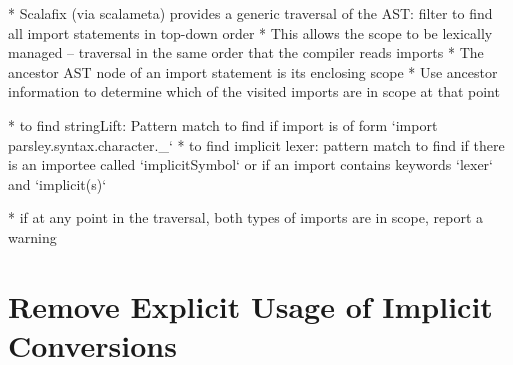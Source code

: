 \documentclass[../../main.tex]{subfiles}
\begin{document}
* Scalafix (via scalameta) provides a generic traversal of the AST: filter to find all import statements in top-down order
* This allows the scope to be lexically managed -- traversal in the same order that the compiler reads imports
* The ancestor AST node of an import statement is its enclosing scope
* Use ancestor information to determine which of the visited imports are in scope at that point

* to find stringLift: Pattern match to find if import is of form `import parsley.syntax.character.\_`
* to find implicit lexer: pattern match to find if there is an importee called `implicitSymbol` or if an import contains keywords `lexer` and `implicit(s)`

* if at any point in the traversal, both types of imports are in scope, report a warning

\section{Remove Explicit Usage of Implicit Conversions}
\end{document}
